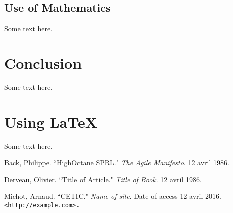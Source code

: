\documentclass[11pt]{article}
\begin{document}
\subsection{Use of Mathematics}
Some text here.

\section{Conclusion}
Some text here.

\section{Using \LaTeX\ }
Some text here.

\pagebreak

\begin{thebibliography}{}


Back, Philippe.
``HighOctane SPRL."
\textit{The Agile Manifesto}.
12 avril 1986.

Derveau, Olivier.
``Title of Article."
\textit{Title of Book}.
12 avril 1986.

Michot, Arnaud.
``CETIC."
\textit{Name of site}.
Date of access 12 avril 2016.
\texttt{<http://example.com>.}


\end{thebibliography}
\end{document}
